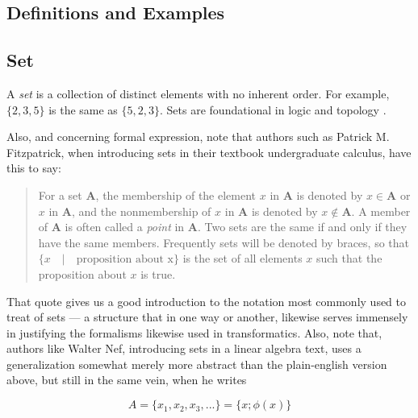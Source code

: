 \documentclass[a4paper, 18pt]{book} %
\begin{document}
\begin{appendices}
\section*{Definitions and Examples}
\label{SECDEFSTRUCTURES}

\subsection*{Set}
A \emph{set} is a collection of distinct elements with no inherent order. For example, $\{2, 3, 5\}$ is the same as $\{5, 2, 3\}$. Sets are foundational in logic and topology \cite{halmos1960naive}.

Also, and concerning formal expression, note that authors such as Patrick M. Fitzpatrick, when introducing sets in their textbook undergraduate calculus\cite{fitzpatrick1995advanced}, have this to say:


\noindent
\begin{minipage}{1\textwidth}
\vspace{1em}
\begin{quotation}
{\ttfamily

For a set \textbf{A}, the membership of the element $x$ in \textbf{A} is denoted by $x \in \textbf{A}$ or $x$ in \textbf{A}, and the nonmembership of $x$ in \textbf{A} is denoted by $x \not\in \textbf{A}$. A member of \textbf{A} is often called a \textit{point} in \textbf{A}. Two sets are the same if and only if they have the same members. Frequently sets will be denoted by braces, so that $\{ x \quad | \quad \text{proposition about x}\}$ is the set of all elements $x$ such that the proposition about $x$ is true.

}
\end{quotation}
\vspace{1em}
\end{minipage}

\vspace{2em}

That quote gives us a good introduction to the notation most commonly used to treat of sets --- a structure that in one way or another, likewise serves immensely in justifying the formalisms likewise used in transformatics. Also, note that, authors like Walter Nef, introducing sets in a linear algebra text\cite{nef1967linear}, uses a generalization somewhat merely more abstract than the plain-english version above, but still in the same vein, when he writes 


\begin{equation}
\label{EQSETNOT}
A = \{ x_1, x_2, x_3, ... \} = \{ x ; \phi(x) \}
\end{equation}


\end{appendices}
\end{document}
